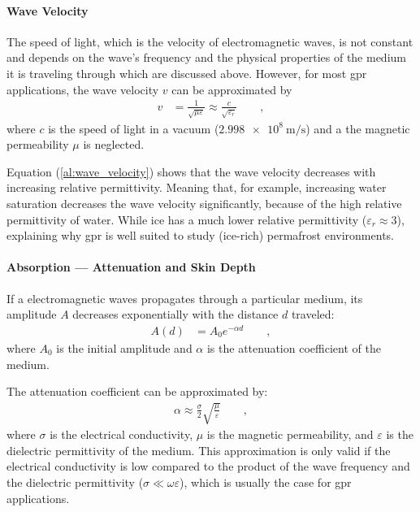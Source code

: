 \paragraph{Wave Velocity}
The speed of light, which is the velocity of electromagnetic waves, is not constant and depends on the wave's frequency and the physical properties of the medium it is traveling through which are discussed above. 
However, for most \gls{gpr} applications, the wave velocity \(v\) can be approximated by 
\begin{align}
    v &= \frac{1}{\sqrt{\mu \varepsilon}} \approx \frac{c}{\sqrt{\varepsilon_r}} \qquad , \label{al:wave_velocity}
\end{align}
where \(c\) is the speed of light in a vacuum (\(\SI{2.998e8}{\meter\per\second}\)) and a the magnetic permeability \(\mu\) is neglected.

Equation (\ref{al:wave_velocity}) shows that the wave velocity decreases with increasing relative permittivity.
Meaning that, for example, increasing water saturation decreases the wave velocity significantly, because of the high relative permittivity of water. 
While ice has a much lower relative permittivity (\(\varepsilon_r \approx 3\)), explaining why \gls{gpr} is well suited to study (ice-rich) permafrost environments.

\paragraph{Absorption --- Attenuation and Skin Depth}
If a electromagnetic waves propagates through a particular medium, its amplitude \(A\) decreases exponentially with the distance \(d\) traveled:
\begin{align}
    A(d) &= A_0 e^{-\alpha d} \qquad ,\label{al:attenuation}
\end{align}
where \(A_0\) is the initial amplitude and \(\alpha\) is the attenuation coefficient of the medium.

The attenuation coefficient can be approximated by:
\begin{align}
    \alpha \approx \frac{\sigma}{2}\sqrt{\frac{\mu}{\varepsilon}} \qquad ,\label{al:attenuation_coefficient}
\end{align}
where \(\sigma\) is the electrical conductivity, \(\mu\) is the magnetic permeability, and \(\varepsilon\) is the dielectric permittivity of the medium.
This approximation is only valid if the electrical conductivity is low compared to the product of the wave frequency and the dielectric permittivity (\(\sigma \ll \omega \varepsilon\)), which is usually the case for \gls{gpr} applications.

